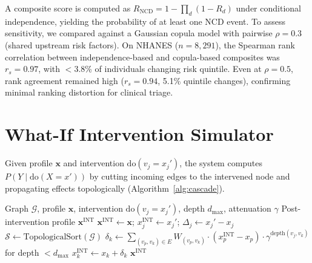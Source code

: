 \documentclass[runningheads]{llncs}
\begin{document}
A composite score is computed as
$R_{\mathrm{NCD}} = 1 - \prod_{d} (1 - R_d)$
under conditional independence, yielding the probability of at least
one NCD event.
To assess sensitivity, we compared against a Gaussian copula model
with pairwise $\rho = 0.3$ (shared upstream risk factors).
On NHANES ($n = 8{,}291$), the Spearman rank correlation between
independence-based and copula-based composites was $r_s = 0.97$,
with $<$3.8\% of individuals changing risk quintile.
Even at $\rho = 0.5$, rank agreement remained high
($r_s = 0.94$, 5.1\% quintile changes), confirming minimal
ranking distortion for clinical triage.

\section{What-If Intervention Simulator}\label{sec:whatif}

Given profile $\mathbf{x}$ and intervention
$\mathrm{do}(v_j = x_j')$, the system computes
$P(Y \mid \mathrm{do}(X = x'))$ by cutting incoming edges to the
intervened node and propagating effects topologically
(Algorithm~\ref{alg:cascade}).

\begin{algorithm}[t]
\caption{Topological Intervention Cascade}
\label{alg:cascade}
\begin{algorithmic}[1]
\REQUIRE Graph $\mathcal{G}$, profile $\mathbf{x}$, intervention
  $\mathrm{do}(v_j = x_j')$, depth $d_{\max}$, attenuation $\gamma$
\ENSURE Post-intervention profile $\mathbf{x}^{\mathrm{INT}}$
\STATE $\mathbf{x}^{\mathrm{INT}} \leftarrow \mathbf{x}$;
  $x_j^{\mathrm{INT}} \leftarrow x_j'$;
  $\Delta_j \leftarrow x_j' - x_j$
\STATE $\mathcal{S} \leftarrow \text{TopologicalSort}(\mathcal{G})$
  \STATE $\delta_k \leftarrow \sum_{(v_p, v_k) \in E} W_{(v_p,v_k)} \cdot (x_p^{\mathrm{INT}} - x_p) \cdot \gamma^{\text{depth}(v_j,v_k)}$ for depth $< d_{\max}$
  \STATE $x_k^{\mathrm{INT}} \leftarrow x_k + \delta_k$
\ENDFOR
\RETURN $\mathbf{x}^{\mathrm{INT}}$
\end{algorithmic}
\end{algorithm}
\end{document}
